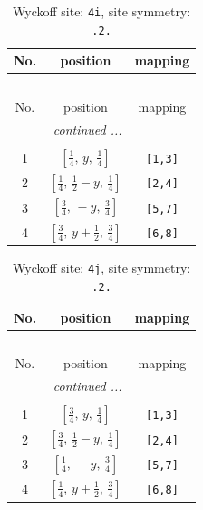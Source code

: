 \documentclass[fleqn,8pt]{jsarticle}
\begin{document}
\renewcommand{\arraystretch}{1.2}
\begin{longtable}{ccc}
\caption{Wyckoff site: {\tt 4i}, site symmetry: {\tt .2.}}
 \\
 \hline \hline
No. & position & mapping \\ \hline \endfirsthead

\multicolumn{2}{l}{\tablename\ \thetable{}} \\
 \hline \hline
No. & position & mapping \\ \hline \endhead

 \hline \hline
\multicolumn{2}{r}{\footnotesize\it continued ...} \\ \endfoot

 \hline \hline
\multicolumn{2}{r}{} \\ \endlastfoot

1 & $\left[ \frac{1}{4},\, y,\, \frac{1}{4} \right]$ & {\tt [1,3]} \\ \hline
2 & $\left[ \frac{1}{4},\, \frac{1}{2} - y,\, \frac{1}{4} \right]$ & {\tt [2,4]} \\ \hline
3 & $\left[ \frac{3}{4},\, - y,\, \frac{3}{4} \right]$ & {\tt [5,7]} \\ \hline
4 & $\left[ \frac{3}{4},\, y + \frac{1}{2},\, \frac{3}{4} \right]$ & {\tt [6,8]} \\
\end{longtable}
\renewcommand{\arraystretch}{1.2}
\begin{longtable}{ccc}
\caption{Wyckoff site: {\tt 4j}, site symmetry: {\tt .2.}}
 \\
 \hline \hline
No. & position & mapping \\ \hline \endfirsthead

\multicolumn{2}{l}{\tablename\ \thetable{}} \\
 \hline \hline
No. & position & mapping \\ \hline \endhead

 \hline \hline
\multicolumn{2}{r}{\footnotesize\it continued ...} \\ \endfoot

 \hline \hline
\multicolumn{2}{r}{} \\ \endlastfoot

1 & $\left[ \frac{3}{4},\, y,\, \frac{1}{4} \right]$ & {\tt [1,3]} \\ \hline
2 & $\left[ \frac{3}{4},\, \frac{1}{2} - y,\, \frac{1}{4} \right]$ & {\tt [2,4]} \\ \hline
3 & $\left[ \frac{1}{4},\, - y,\, \frac{3}{4} \right]$ & {\tt [5,7]} \\ \hline
4 & $\left[ \frac{1}{4},\, y + \frac{1}{2},\, \frac{3}{4} \right]$ & {\tt [6,8]} \\
\end{longtable}
\end{document}
